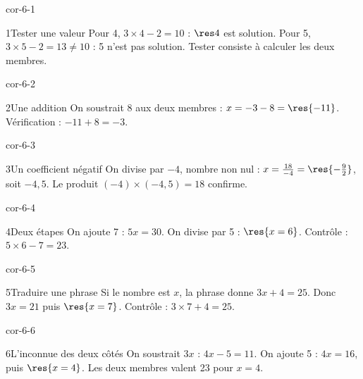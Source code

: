 \clearpage\pagestyle{otMain}\setlength{\otBlocEspacement}{2.5mm}\fontsize{11}{15}\selectfont{}
\begin{blocLivre}{cor-6-1}\begin{corrige}{1}{Tester une valeur}
Pour 4, $3\times4-2=10$ : $\res4$ est solution. Pour 5, $3\times5-2=13\ne10$ : 5 n’est pas solution. Tester consiste à calculer les deux membres.
\end{corrige}\end{blocLivre}
\begin{blocLivre}{cor-6-2}\begin{corrige}{2}{Une addition}
On soustrait 8 aux deux membres : $x=-3-8=\res{-11}$. Vérification : $-11+8=-3$.
\end{corrige}\end{blocLivre}
\begin{blocLivre}{cor-6-3}\begin{corrige}{3}{Un coefficient négatif}
On divise par $-4$, nombre non nul : $x=\frac{18}{-4}=\res{-\frac92}$, soit $-4{,}5$. Le produit $(-4)\times(-4{,}5)=18$ confirme.
\end{corrige}\end{blocLivre}
\begin{blocLivre}{cor-6-4}\begin{corrige}{4}{Deux étapes}
On ajoute 7 : $5x=30$. On divise par 5 : $\res{x=6}$. Contrôle : $5\times6-7=23$.
\end{corrige}\end{blocLivre}
\begin{blocLivre}{cor-6-5}\begin{corrige}{5}{Traduire une phrase}
Si le nombre est $x$, la phrase donne $3x+4=25$. Donc $3x=21$ puis $\res{x=7}$. Contrôle : $3\times7+4=25$.
\end{corrige}\end{blocLivre}
\begin{blocLivre}{cor-6-6}\begin{corrige}{6}{L’inconnue des deux côtés}
On soustrait $3x$ : $4x-5=11$. On ajoute 5 : $4x=16$, puis $\res{x=4}$. Les deux membres valent 23 pour $x=4$.
\end{corrige}\end{blocLivre}
